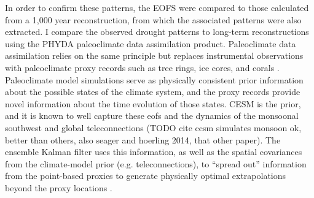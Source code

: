 \documentclass[11pt]{wlscirep}
\begin{document}
In order to confirm these patterns, the EOFS were compared to those calculated from a 1,000 year reconstruction, from which the associated patterns were also extracted. I compare the observed drought patterns to long-term reconstructions using the PHYDA paleoclimate data assimilation product. Paleoclimate data assimilation relies on the same principle but replaces instrumental observations with paleoclimate proxy records such as tree rings, ice cores, and corals \cite{Hakim2016TheResults}. Paleoclimate model simulations serve as physically consistent prior information about the possible states of the climate system, and the proxy records provide novel information about the time evolution of those states. CESM is the prior, and it is known to well capture these eofs and the dynamics of the monsoonal southwest and global teleconnections (TODO cite ccsm simulates monsoon ok, better than others, also seager and hoerling 2014, that other paper). The ensemble Kalman filter uses this information, as well as the spatial covariances from the climate-model prior (e.g. teleconnections), to ``spread out'' information from the point-based proxies to generate physically optimal extrapolations beyond the proxy locations \cite{Acevedo2015TowardsTechniques,Hakim2016TheResults}.
\end{document}
